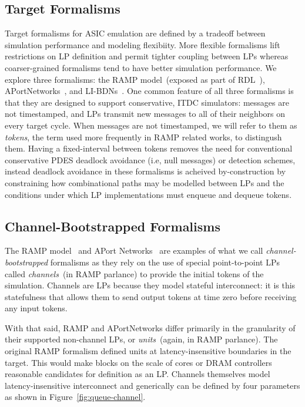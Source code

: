 \subsection{Target Formalisms}

Target formalisms for ASIC emulation are defined by a tradeoff
between simulation performance and modeling flexibiity. More flexible
formalisms lift restrictions on LP definition and permit tighter coupling
between LPs whereas coarser-grained formalisms tend
to have better simulation performance. We explore three
formalisms: the RAMP model~(exposed as part of RDL~\cite{RDL}),
APortNetworks~\cite{APortNetworks}, and LI-BDNs~\cite{LIBDN}. One common
feature of all three formalisms is that they are designed to support conservative, ITDC
simulators: messages are not timestamped, and LPs transmit new messages to all
of their neighbors on every target cycle. When messages are not timestamped, we will refer
to them as \emph{tokens}, the term used more frequently in RAMP related works, to distingush them. 
Having a fixed-interval between tokens removes the need for conventional conservative PDES deadlock avoidance
(i.e, null messages) or detection schemes, instead deadlock avoidance in these
formalisms is acheived by-construction by constraining how combinational paths
may be modelled between LPs and the conditions under which LP implementations
must enqueue and dequeue tokens.

\subsection{Channel-Bootstrapped Formalisms}

The RAMP model~\cite{RDL} and APort Networks~\cite{APortNetworks} are examples of what we call
\emph{channel-bootstrapped} formalisms as they rely on the use of special
point-to-point LPs called \emph{channels}~(in RAMP parlance) to provide the
initial tokens of the simulation. Channels are LPs because they
model stateful interconnect: it is this statefulness that allows them to send output
tokens at time zero before receiving any input tokens.

With that said, RAMP and APortNetworks differ primarily in the granularity of
their supported non-channel LPs, or \emph{units}~(again, in RAMP parlance). The
original RAMP formalism defined units at latency-insensitive boundaries in the
target. This would make blocks on the scale of cores or DRAM controllers
reasonable candidates for definition as an LP. Channels themselves model
latency-insensitive interconnect and generically can be defined by four
parameters as shown in Figure~\ref{fig:queue-channel}.

